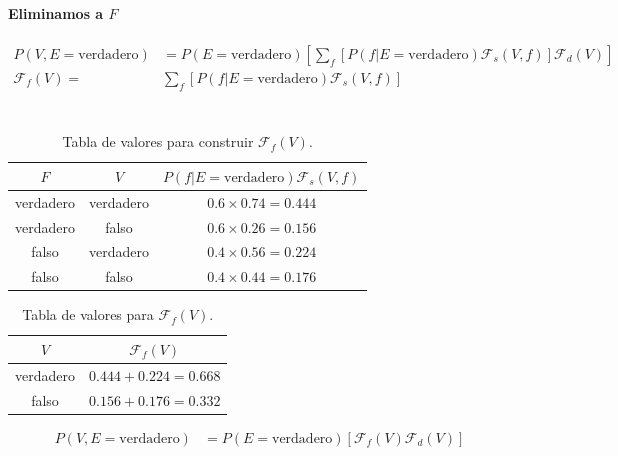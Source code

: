 \documentclass[12pt]{article}
\begin{document}
\paragraph{Eliminamos a $F$}
\begin{equation}
\begin{split}
P(V,E=\text{verdadero})&=P(E=\text{verdadero})[\sum_{f}[P(f|E=\text{verdadero})\mathcal{F}_s(V,f)]\mathcal{F}_d(V)]\\
\mathcal{F}_f(V)=& \sum_{f}[P(f|E=\text{verdadero})\mathcal{F}_s(V,f)]\\
\end{split}
\end{equation}\\
\begin{table}[h!]
	\centering
	\begin{tabular}{|c|c|c|}
		\hline
		\rowcolor[gray]{.8}
		$F$&$V$&$P(f|E=\text{verdadero})\mathcal{F}_s(V,f)$ \\\hline %
		verdadero&verdadero & $0.6\times0.74=0.444$\\\hline
		verdadero&falso & $0.6\times0.26=0.156$\\\hline
		falso&verdadero & $0.4\times0.56=0.224$\\\hline
		falso&falso & $0.4\times0.44=0.176$\\\hline
	\end{tabular}
	\caption{Tabla de valores para construir $\mathcal{F}_f(V)$.}
	\label{tab:ej3011}
\end{table}
\begin{table}[h!]
	\centering
	\begin{tabular}{|c|c|}
		\hline
		\rowcolor[gray]{.8}
		$V$&$\mathcal{F}_f(V)$ \\\hline %
		verdadero & $0.444+0.224=0.668$\\\hline
		falso & $0.156+0.176=0.332$\\\hline
	\end{tabular}
	\caption{Tabla de valores para $\mathcal{F}_f(V)$.}
	\label{tab:ej3012}
\end{table}
\begin{equation}
\begin{split}
P(V,E=\text{verdadero})&=P(E=\text{verdadero})[\mathcal{F}_f(V)\mathcal{F}_d(V)]\\
\end{split}
\end{equation}\\
\end{document}
